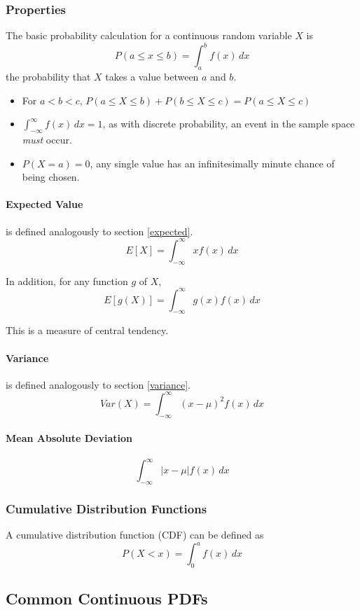 \documentclass{article}
\begin{document}
\subsubsection{Properties}
The basic probability calculation for a continuous random variable $X$ is
$$P(a \le x \le b)=\int_a^b f(x)\,dx$$
the probability that $X$ takes a value between $a$ and $b$.

\begin{itemize}
    \item For $a < b < c$, $P(a \le X \le b) + P(b \le X \le c) = P(a \le X \le c)$
    \item $\int_{-\infty}^\infty f(x)\,dx = 1$, as with discrete probability, an event in the sample space \emph{must} occur.
    \item $P(X = a) = 0$, any single value has an infinitesimally minute chance of being chosen.
\end{itemize}

\paragraph{Expected Value} is defined analogously to section \ref{expected}.
$$E[X] = \int_{-\infty}^\infty xf(x)\,dx$$

In addition, for any function $g$ of $X$, $$E[g(X)] = \int_{-\infty}^\infty g(x)f(x)\,dx$$

This is a measure of central tendency.

\paragraph{Variance} is defined analogously to section \ref{variance}.
$$Var(X) = \int_{-\infty}^\infty \left(x-\mu\right)^2f(x)\,dx$$

\paragraph{Mean Absolute Deviation}
$$\int_{-\infty}^\infty |x-\mu|f(x)\,dx$$

\subsubsection{Cumulative Distribution Functions}
A cumulative distribution function (CDF) can be defined as
$$P(X < x) = \int_0^a f(x)\,dx$$

\subsection{Common Continuous PDFs}
\end{document}
